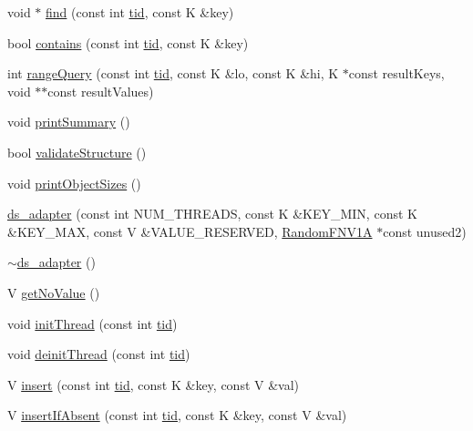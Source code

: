 \begin{DoxyCompactItemize}
\item 
void $\ast$ \hyperlink{classds__adapter_a72789b1ba53b99df79b49b42e4d205ac}{find} (const int \hyperlink{microbench_2main_8cpp_a9ca9869868fe7e7a38a921cc7de4103f}{tid}, const K \&key)
\item 
bool \hyperlink{classds__adapter_aecf1899dbe9fae93c72ee2b5549cf6eb}{contains} (const int \hyperlink{microbench_2main_8cpp_a9ca9869868fe7e7a38a921cc7de4103f}{tid}, const K \&key)
\item 
int \hyperlink{classds__adapter_a338432893114d1df6dc2576e784b7f51}{range\+Query} (const int \hyperlink{microbench_2main_8cpp_a9ca9869868fe7e7a38a921cc7de4103f}{tid}, const K \&lo, const K \&hi, K $\ast$const result\+Keys, void $\ast$$\ast$const result\+Values)
\item 
void \hyperlink{classds__adapter_aac97293215557665d2ef1e1a0d06fcfd}{print\+Summary} ()
\item 
bool \hyperlink{classds__adapter_ae50fe8a8683c0278cdd4c45e1405860d}{validate\+Structure} ()
\item 
void \hyperlink{classds__adapter_a33b13b7059a8c0345fb59a324dc3a691}{print\+Object\+Sizes} ()
\item 
\hyperlink{classds__adapter_a33d831d99b41a9c7ffa38f8c0eb0ab5e}{ds\+\_\+adapter} (const int N\+U\+M\+\_\+\+T\+H\+R\+E\+A\+DS, const K \&K\+E\+Y\+\_\+\+M\+IN, const K \&K\+E\+Y\+\_\+\+M\+AX, const V \&V\+A\+L\+U\+E\+\_\+\+R\+E\+S\+E\+R\+V\+ED, \hyperlink{classRandomFNV1A}{Random\+F\+N\+V1A} $\ast$const unused2)
\item 
\hyperlink{classds__adapter_a366f46dd39d59f2d4a147589f5fd98e3}{$\sim$ds\+\_\+adapter} ()
\item 
V \hyperlink{classds__adapter_a9e1e4aec136b351d1a6820d70484a6c5}{get\+No\+Value} ()
\item 
void \hyperlink{classds__adapter_a3733f6a6b57312b1b5e4fb5181d82a0b}{init\+Thread} (const int \hyperlink{microbench_2main_8cpp_a9ca9869868fe7e7a38a921cc7de4103f}{tid})
\item 
void \hyperlink{classds__adapter_a173ca48b19fc1dc346159ea582c690cd}{deinit\+Thread} (const int \hyperlink{microbench_2main_8cpp_a9ca9869868fe7e7a38a921cc7de4103f}{tid})
\item 
V \hyperlink{classds__adapter_a6c0fc676d77e30e14946baf325174739}{insert} (const int \hyperlink{microbench_2main_8cpp_a9ca9869868fe7e7a38a921cc7de4103f}{tid}, const K \&key, const V \&val)
\item 
V \hyperlink{classds__adapter_ae9cb29ad0c0338c0e1d12ef97e008135}{insert\+If\+Absent} (const int \hyperlink{microbench_2main_8cpp_a9ca9869868fe7e7a38a921cc7de4103f}{tid}, const K \&key, const V \&val)
$$
\end{DoxyCompactItemize}
